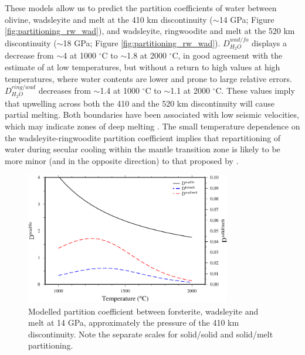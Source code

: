 \documentclass[review]{elsarticle}
\begin{document}
These models allow us to predict the partition coefficients of water between olivine, wadsleyite and melt at the 410 km discontinuity ($\sim$14 GPa; Figure \ref{fig:partitioning_rw_wad}), and wadsleyite, ringwoodite and melt at the 520 km discontinuity ($\sim$18 GPa; Figure \ref{fig:partitioning_rw_wad}). $D^{wad/fo}_{H_2O}$ displays a decrease from $\sim$4 at 1000 $^{\circ}$C to $\sim$1.8 at 2000 $^{\circ}$C, in good agreement with the estimate of \cite{LSOK2011} at low temperatures, but without a return to high values at high temperatures, where water contents are lower and prone to large relative errors. $D^{ring/wad}_{H_2O}$ decreases from $\sim$1.4 at 1000 $^{\circ}$C to $\sim$1.1 at 2000 $^{\circ}$C. These values imply that upwelling across both the 410 and the 520 km discontinuity will cause partial melting. Both boundaries have been associated with low seismic velocities, which may indicate zones of deep melting \citep[e.g.][]{JDH2010}. The small temperature dependence on the wadsleyite-ringwoodite partition coefficient implies that repartitioning of water during secular cooling within the mantle transition zone is likely to be more minor (and in the opposite direction) to that proposed by \cite{DDFK2005}. 

\begin{figure}[ht!]
  \centering
  \includegraphics[width=0.8\textwidth]{figures/wad_fo_partitioning_410}
  \caption{Modelled partition coefficient between forsterite, wadsleyite and melt at 14 GPa, approximately the pressure of the 410 km discontinuity. Note the separate scales for solid/solid and solid/melt partitioning.}
  \label{fig:partitioning_wad_fo}
\end{figure}
\end{document}
